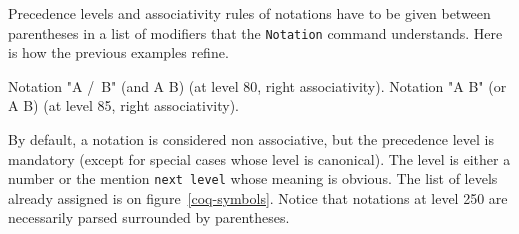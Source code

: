 Precedence levels and associativity rules of notations have to be
given between parentheses in a list of modifiers that the
\texttt{Notation} command understands. Here is how the previous
examples refine.

\begin{coq_example*}
Notation "A /\ B" (and A B) (at level 80, right associativity).
Notation "A \/ B" (or A B)  (at level 85, right associativity).
\end{coq_example*}

By default, a notation is considered non associative, but the
precedence level is mandatory (except for special cases whose level is
canonical). The level is either a number or the mention {\tt next
level} whose meaning is obvious. The list of levels already assigned
is on figure~\ref{coq-symbols}. Notice that notations at level 250 are
necessarily parsed surrounded by parentheses.

